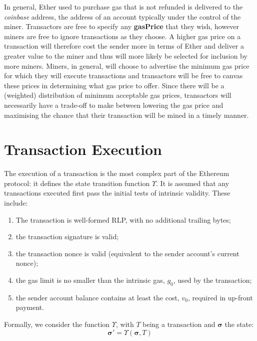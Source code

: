 \documentclass[9pt,oneside]{amsart}
\begin{document}
\begin{multicols}{2}
In general, Ether used to purchase gas that is not refunded is delivered to the \textit{coinbase} address, the address of an account typically under the control of the miner. Transactors are free to specify any \textbf{gasPrice} that they wish, however miners are free to ignore transactions as they choose. A higher gas price on a transaction will therefore cost the sender more in terms of Ether and deliver a greater value to the miner and thus will more likely be selected for inclusion by more miners. Miners, in general, will choose to advertise the minimum gas price for which they will execute transactions and transactors will be free to canvas these prices in determining what gas price to offer. Since there will be a (weighted) distribution of minimum acceptable gas prices, transactors will necessarily have a trade-off to make between lowering the gas price and maximising the chance that their transaction will be mined in a timely manner.


\section{Transaction Execution} \label{ch:transactions}

The execution of a transaction is the most complex part of the Ethereum protocol: it defines the state transition function $\Upsilon$. It is assumed that any transactions executed first pass the initial tests of intrinsic validity. These include:

\begin{enumerate}
\item The transaction is well-formed RLP, with no additional trailing bytes;
\item the transaction signature is valid;
\item the transaction nonce is valid (equivalent to the sender account's current nonce);
\item the gas limit is no smaller than the intrinsic gas, $g_0$, used by the transaction;
\item the sender account balance contains at least the cost, $v_0$, required in up-front payment.
\end{enumerate}

Formally, we consider the function $\Upsilon$, with $T$ being a transaction and $\boldsymbol{\sigma}$ the state:
\begin{equation}
\boldsymbol{\sigma}' = \Upsilon(\boldsymbol{\sigma}, T)
\end{equation}


\end{multicols}
\end{document}

